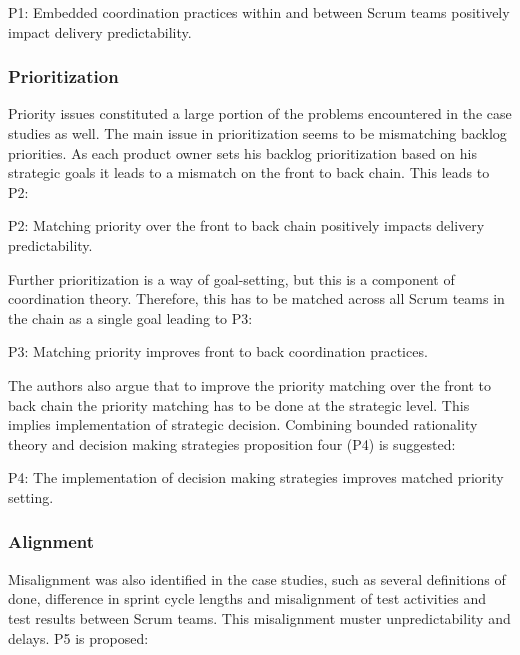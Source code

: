 \begin{fancyquotes}
P1: Embedded coordination practices within and between Scrum teams positively impact delivery predictability.
\end{fancyquotes}

\subsubsection{Prioritization}

Priority issues constituted a large portion of the problems encountered in the case studies as well. The main issue in prioritization seems to be mismatching backlog priorities. As each product owner sets his backlog prioritization based on his strategic goals it leads to a mismatch on the front to back chain. This leads to P2:

\begin{fancyquotes}
P2: Matching priority over the front to back chain positively impacts delivery predictability.
\end{fancyquotes}

Further prioritization is a way of goal-setting, but this is a component of coordination theory. Therefore, this has to be matched across all Scrum teams in the chain as a single goal leading to P3:

\begin{fancyquotes}
P3: Matching priority improves front to back coordination practices.
\end{fancyquotes}

The authors also argue that to improve the priority matching over the front to back chain the priority matching has to be done at the strategic level. This implies implementation of strategic decision. Combining bounded rationality theory and decision making strategies proposition four (P4) is suggested:

\begin{fancyquotes}
P4: The implementation of decision making strategies improves matched priority setting.
\end{fancyquotes}

\subsubsection{Alignment}

Misalignment was also identified in the case studies, such as several definitions of done, difference in sprint cycle lengths and misalignment of test activities and test results between Scrum teams. This misalignment muster unpredictability and delays. P5 is proposed:

